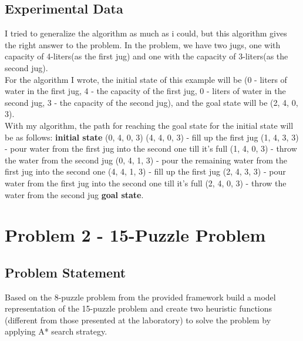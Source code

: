 \documentclass[14pt]{article}
\begin{document}
\subsection{Experimental Data}
I tried to generalize the algorithm as much as i could, but this algorithm gives the right answer to the problem. In the problem, we have two jugs, one with capacity of 4-liters(as the first jug) and one with the capacity of 3-liters(as the second jug).
\vspace{2.5 mm}
\\For the algorithm I wrote, the initial state of this example will be (0 - liters of water in the first jug, 4 - the capacity of the first jug, 0 - liters of water in the second jug, 3 - the capacity of the second jug), and the goal state will be (2, 4, 0, 3).
\vspace{2.5 mm}
\\With my algorithm, the path for reaching the goal state for the initial state will be as follows: \textbf{initial state} \textrightarrow (0, 4, 0, 3) \textrightarrow (4, 4, 0, 3) - fill up the first jug \textrightarrow (1, 4, 3, 3) - pour water from the first jug into the second one till it's full \textrightarrow (1, 4, 0, 3) - throw the water from the second jug \textrightarrow (0, 4, 1, 3) - pour the remaining water from the first jug into the second one \textrightarrow (4, 4, 1, 3) - fill up the first jug \textrightarrow (2, 4, 3, 3) - pour water from the first jug into the second one till it's full \textrightarrow (2, 4, 0, 3) - throw the water from the second jug \textrightarrow \textbf{goal state}.
\section{Problem 2 - 15-Puzzle Problem}
\subsection{Problem Statement}
Based on the 8-puzzle problem from the provided framework build a model representation of the 15-puzzle problem and create two
heuristic functions (different from those presented at the laboratory) to solve
the problem by applying A* search strategy.
\end{document}
